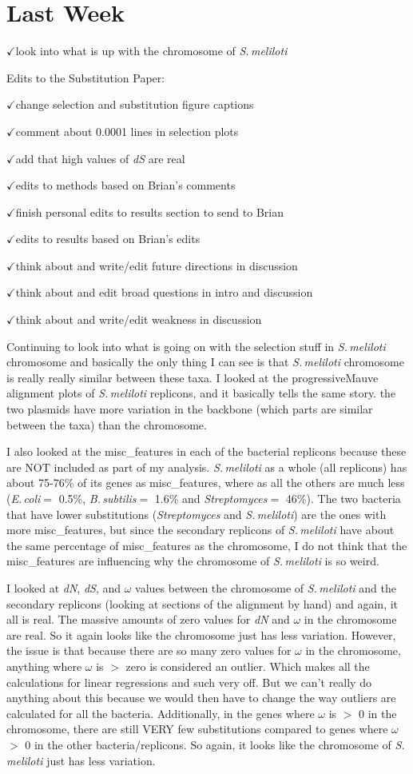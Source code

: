 \documentclass[12pt]{article}
\newcommand{\smel}{\textit{S.\,meliloti}\xspace}
\newcommand{\p}{progressiveMauve\xspace}
\newcommand{\strep}{\textit{Streptomyces}\xspace}
\newcommand{\bass}{\textit{B.\,subtilis}\xspace}
\newcommand{\ecol}{\textit{E.\,coli}\xspace}
\newcommand{\ch}{$\checkmark$}
\newcommand{\dn}{\textit{dN}\xspace}
\newcommand{\ds}{\textit{dS}\xspace}
\begin{document}
	
\section*{Last Week}

\ch look into what is up with the chromosome of \smel

Edits to the Substitution Paper:

\ch change selection and substitution figure captions

\ch comment about 0.0001 lines in selection plots

\ch add that high values of \ds are real

\ch edits to methods based on Brian's comments

\ch finish personal edits to results section to send to Brian

\ch edits to results based on Brian's edits

\ch think about and write/edit future directions in discussion

\ch think about and edit broad questions in intro and discussion

\ch think about and write/edit weakness in discussion

Continuing to look into what is going on with the selection stuff in \smel chromosome and basically the only thing I can see is that \smel chromosome is really really similar between these taxa.
I looked at the \p alignment plots of \smel replicons, and it basically tells the same story.
the two plasmids have more variation in the backbone (which parts are similar between the taxa) than the chromosome.

I also looked at the misc\_features in each of the bacterial replicons because these are NOT included as part of my analysis.
\smel as a whole (all replicons) has about 75-76\% of its genes as misc\_features, where as all the others are much less (\ecol $=$ 0.5\%, \bass $=$ 1.6\% and \strep $=$ 46\%).
The two bacteria that have lower substitutions (\strep and \smel) are the ones with more misc\_features, but since the secondary replicons of \smel have about the same percentage of misc\_features as the chromosome, I do not think that the misc\_features are influencing why the chromosome of \smel is so weird.

I looked at \dn, \ds, and $\omega$ values between the chromosome of \smel and the secondary replicons (looking at sections of the alignment by hand) and again, it all is real. The massive amounts of zero values for \dn and $\omega$ in the chromosome are real. So it again looks like the chromosome just has less variation.
However, the issue is that because there are so many zero values for $\omega$ in the chromosome, anything where $\omega$ is $>$ zero is considered an outlier. Which makes all the calculations for linear regressions and such very off.
But we can't really do anything about this because we would then have to change the way outliers are calculated for all the bacteria.
Additionally, in the genes where $\omega$ is $>$ 0 in the chromosome, there are still VERY few substitutions compared to genes where $\omega$ $>$ 0 in the other bacteria/replicons.
So again, it looks like the chromosome of \smel just has less variation.
\end{document}

